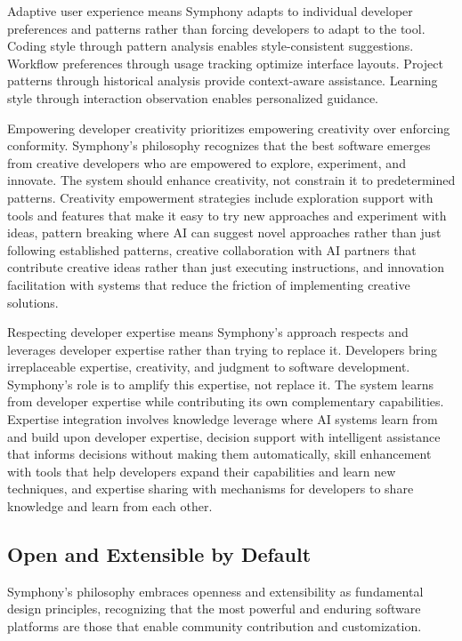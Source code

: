 Adaptive user experience means Symphony adapts to individual developer preferences and patterns rather than forcing developers to adapt to the tool. Coding style through pattern analysis enables style-consistent suggestions. Workflow preferences through usage tracking optimize interface layouts. Project patterns through historical analysis provide context-aware assistance. Learning style through interaction observation enables personalized guidance.

Empowering developer creativity prioritizes empowering creativity over enforcing conformity. Symphony's philosophy recognizes that the best software emerges from creative developers who are empowered to explore, experiment, and innovate. The system should enhance creativity, not constrain it to predetermined patterns. Creativity empowerment strategies include exploration support with tools and features that make it easy to try new approaches and experiment with ideas, pattern breaking where AI can suggest novel approaches rather than just following established patterns, creative collaboration with AI partners that contribute creative ideas rather than just executing instructions, and innovation facilitation with systems that reduce the friction of implementing creative solutions.

Respecting developer expertise means Symphony's approach respects and leverages developer expertise rather than trying to replace it. Developers bring irreplaceable expertise, creativity, and judgment to software development. Symphony's role is to amplify this expertise, not replace it. The system learns from developer expertise while contributing its own complementary capabilities. Expertise integration involves knowledge leverage where AI systems learn from and build upon developer expertise, decision support with intelligent assistance that informs decisions without making them automatically, skill enhancement with tools that help developers expand their capabilities and learn new techniques, and expertise sharing with mechanisms for developers to share knowledge and learn from each other.

\subsection{Open and Extensible by Default}

Symphony's philosophy embraces openness and extensibility as fundamental design principles, recognizing that the most powerful and enduring software platforms are those that enable community contribution and customization.


